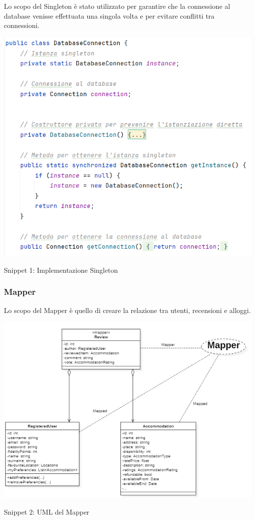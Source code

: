 \documentclass[10pt]{article}
\begin{document}
Lo scopo del Singleton è stato utilizzato per garantire che la connessione al database venisse effettuata una singola volta e per evitare conflitti tra connessioni.
\vspace{-0.3cm}
\begin{center}
\includegraphics[scale=0.45]{Snippets/Singleton}
\par\medskip
Snippet 1: Implementazione Singleton
\par\medskip
\end{center}

\subsubsection{Mapper}

Lo scopo del Mapper è quello di creare la relazione tra utenti, recensioni e alloggi.

\begin{center}
\includegraphics[scale=0.85]{Snippets/Mapper}
\par\medskip
Snippet 2: UML del Mapper
\par\medskip
\end{center}
\end{document}
